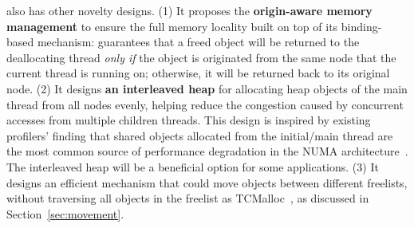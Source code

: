 \NM{} also has other novelty designs. (1) It proposes the \textbf{origin-aware memory management} to ensure the full memory locality built on top of its binding-based mechanism: \NM{} guarantees that a freed object will be returned to the deallocating thread \textit{only if} the object is originated from the same node that the current thread is running on; otherwise, it will be returned back to its original node. (2) It designs \textbf{an interleaved heap} for allocating heap objects of the main thread from all nodes evenly, helping reduce the congestion caused by concurrent accesses from multiple children threads. This design is inspired by existing profilers' finding that shared objects allocated from the initial/main thread are the most common source of performance degradation in the NUMA architecture~\cite{XuNuma, MemProf}. The interleaved heap will be a beneficial option for some applications. (3) It designs an efficient mechanism that could move objects between different freelists, without traversing all objects in the freelist as TCMalloc~\cite{tcmalloc}, as discussed in Section~\ref{sec:movement}. 



